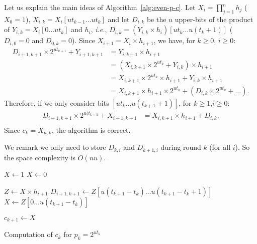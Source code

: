 \documentclass[11pt]{llncs}
\begin{document}
Let us explain the main ideas of Algorithm~\ref{alg:even-p-c}.
Let $X_i = \prod_{j=1}^n h_j$ ($X_0 = 1$), $X_{i,k} = X_i[ut_{k-1}\dots ut_{k}]$ and let $D_{i,k}$ be the $u$ upper-bits of the product of $Y_{i,k} = X_i[0\dots ut_{k}]$ and $h_i$, {\it i.e.}, $D_{i,k} = (Y_{i,k} \times h_i)[ut_k\dots u(t_k+1)]$ ($D_{i,0} = 0$ and $D_{0,k} = 0$).
Since $X_{i+1} = X_i \times h_{i+1}$, we have, for $k \ge 0$, $i \ge 0$:
\begin{align*}
  D_{i+1,k+1} \times 2^{ut_{k+1}} + Y_{i+1,k+1} &= Y_{i,k+1} \times h_{i+1} \\
                 &= (X_{i,k+1} \times 2^{ut_{k}} + Y_{i,k}) \times h_{i+1} \\
                 &= X_{i,k+1} \times 2^{ut_k} \times h_{i+1} + Y_{i,k} \times h_{i+1} \\
                 &= X_{i,k+1}  \times h_{i+1} \times 2^{ut_k} + (D_{i,k} \times 2^{ut_k} + \dots).
\end{align*}
Therefore, if we only consider bits $[ut_k \dots u(t_{k+1}+1)]$, for $k\ge1$,$i\ge0$:
\begin{align*}
  D_{i+1,k+1} \times 2^{u(t_{k+1}} + X_{i+1,k+1} &= X_{i,k+1} \times h_{i+1} + D_{i,k}. \\
\end{align*}
Since $c_k = X_{n,k}$, the algorithm is correct.

We remark we only need to store $D_{k,i}$ and $D_{k+1,i}$ during round $k$ (for all $i$).
So the space complexity is $O(nu)$.


\begin{algorithm}
\newcommand{\vstart}{\ensuremath{\mathrm{start}}}
\newcommand{\vmid}{\ensuremath{\mathrm{mid}}}
\newcommand{\vend}{\ensuremath{\mathrm{end}}}
\begin{algorithmic}[1]

  \State $X \gets 1$
\Else
  \State $X \gets 0$
\EndIf

  \State $Z \gets X \times h_{i+1}$
  \State $D_{i+1,k+1} \gets Z[u(t_{k+1}-t_k)\dots u(t_{k+1}-t_k+1)]$
  \State $X \gets Z[0\dots u(t_{k+1}-t_k)]$
\EndFor

\State $c_{k+1} \gets X$
\end{algorithmic}
\caption{Computation of $c_k$ for $p_k = 2^{ut_k}$}\label{alg:even-p-c}
\end{algorithm}
\end{document}
